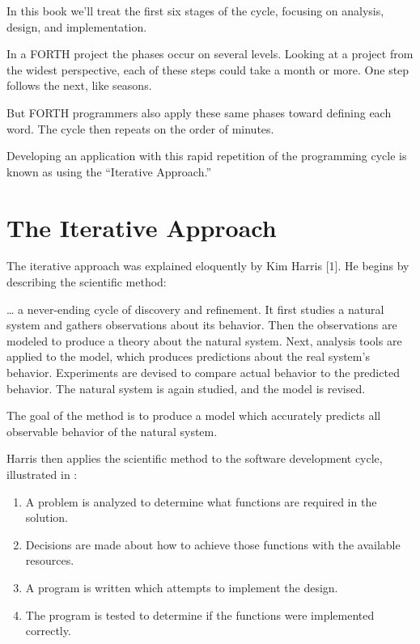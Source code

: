 \noindent In this book we'll treat the first six stages of the cycle,
focusing on analysis, design, and implementation.

In a FORTH project the phases occur on several levels. Looking at a
project from the widest perspective, each of these steps could take a
month or more.  One step follows the next, like seasons.


But FORTH programmers also apply these same phases toward
defining each word. The cycle then repeats on the order of minutes.

Developing an application with this rapid repetition of the
programming cycle is known as using the ``Iterative Approach.''

\section{The Iterative Approach}

\noindent The iterative approach was explained eloquently by Kim
Harris {[}1{]}. He begins by describing the scientific method:

\begin{tfquot}
\noindent \dots{} a never-ending cycle of discovery and refinement. It
first studies a natural system and gathers observations about its
behavior. Then the observations are modeled to produce a theory about
the natural system.  Next, analysis tools are applied to the model,
which produces predictions about the real system's behavior.
Experiments are devised to compare actual behavior to the predicted
behavior. The natural system is again studied, and the model is
revised.

The goal of the method is to produce a model which accurately predicts all
observable behavior of the natural system.
\end{tfquot}

\noindent Harris then applies the scientific method to the software development
cycle, illustrated in :


\begin{enumerate}

\item A problem is analyzed to determine what functions are required
in the solution.

\item Decisions are made about how to achieve those functions with the
available resources.

\item A program is written which attempts to implement the design.
\item The program is tested to determine if the functions were
implemented correctly.

\end{enumerate}

